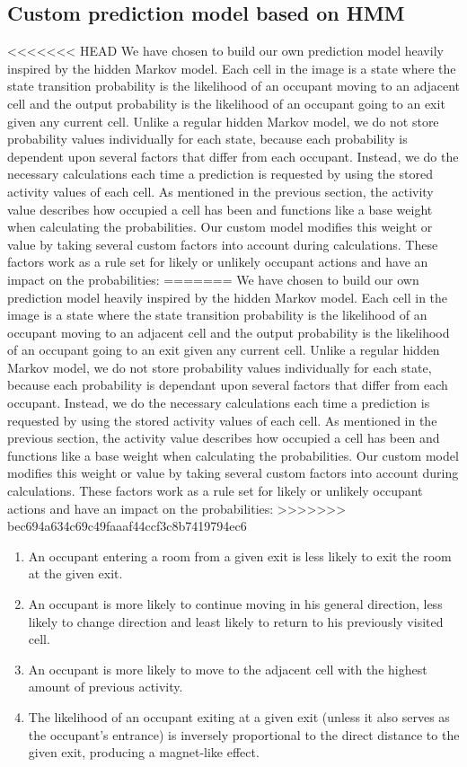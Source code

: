 \subsection{Custom prediction model based on HMM}
\label{ssub:designcustomprediction}
<<<<<<< HEAD
We have chosen to build our own prediction model heavily inspired by the hidden Markov model. Each cell in the image is a state where the state transition probability is the likelihood of an occupant moving to an adjacent cell and the output probability is the likelihood of an occupant going to an exit given any current cell. Unlike a regular hidden Markov model, we do not store probability values individually for each state, because each probability is dependent upon several factors that differ from each occupant. Instead, we do the necessary calculations each time a prediction is requested by using the stored activity values of each cell. As mentioned in the previous section, the activity value describes how occupied a cell has been and functions like a base weight when calculating the probabilities. Our custom model modifies this weight or value by taking several custom factors into account during calculations. These factors work as a rule set for likely or unlikely occupant actions and have an impact on the probabilities:
=======
We have chosen to build our own prediction model heavily inspired by the hidden Markov model. Each cell in the image is a state where the state transition probability is the likelihood of an occupant moving to an adjacent cell and the output probability is the likelihood of an occupant going to an exit given any current cell. Unlike a regular hidden Markov model, we do not store probability values individually for each state, because each probability is dependant upon several factors that differ from each occupant. Instead, we do the necessary calculations each time a prediction is requested by using the stored activity values of each cell. As mentioned in the previous section, the activity value describes how occupied a cell has been and functions like a base weight when calculating the probabilities. Our custom model modifies this weight or value by taking several custom factors into account during calculations. These factors work as a rule set for likely or unlikely occupant actions and have an impact on the probabilities:
>>>>>>> bec694a634c69c49faaaf44ccf3c8b7419794ec6
\begin{enumerate}
\item An occupant entering a room from a given exit is less likely to exit the room at the given exit.
\item An occupant is more likely to continue moving in his general direction, less likely to change direction and least likely to return to his previously visited cell.
\item An occupant is more likely to move to the adjacent cell with the highest amount of previous activity.
\item The likelihood of an occupant exiting at a given exit (unless it also serves as the occupant's entrance) is inversely proportional to the direct distance to the given exit, producing a magnet-like effect.
\end{enumerate}
